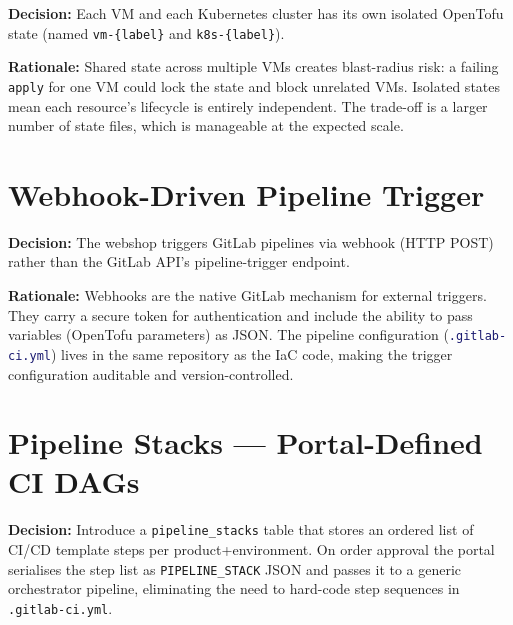 \documentclass[12pt,a4paper,twoside]{report}
\newcommand{\code}[1]{\texttt{#1}}
\newcommand{\file}[1]{\texttt{\textcolor{MidnightBlue}{#1}}}
\begin{document}
\textbf{Decision:} Each VM and each Kubernetes cluster has its own
isolated OpenTofu state (named \code{vm-\{label\}} and
\code{k8s-\{label\}}).

\textbf{Rationale:}
Shared state across multiple VMs creates blast-radius risk: a failing
\code{apply} for one VM could lock the state and block unrelated VMs.
Isolated states mean each resource's lifecycle is entirely independent.
The trade-off is a larger number of state files, which is manageable
at the expected scale.

\section{Webhook-Driven Pipeline Trigger}

\textbf{Decision:} The webshop triggers GitLab pipelines via webhook
(HTTP POST) rather than the GitLab API's pipeline-trigger endpoint.

\textbf{Rationale:}
Webhooks are the native GitLab mechanism for external triggers. They
carry a secure token for authentication and include the ability to pass
variables (OpenTofu parameters) as JSON. The pipeline configuration
(\file{.gitlab-ci.yml}) lives in the same repository as the IaC code,
making the trigger configuration auditable and version-controlled.

\section{Pipeline Stacks — Portal-Defined CI DAGs}
\label{sec:pipeline-stacks-decision}

\textbf{Decision:} Introduce a \code{pipeline\_stacks} table that stores
an ordered list of CI/CD template steps per product+environment.
On order approval the portal serialises the step list as
\code{PIPELINE\_STACK} JSON and passes it to a generic orchestrator
pipeline, eliminating the need to hard-code step sequences in
\texttt{.gitlab-ci.yml}.
\end{document}
